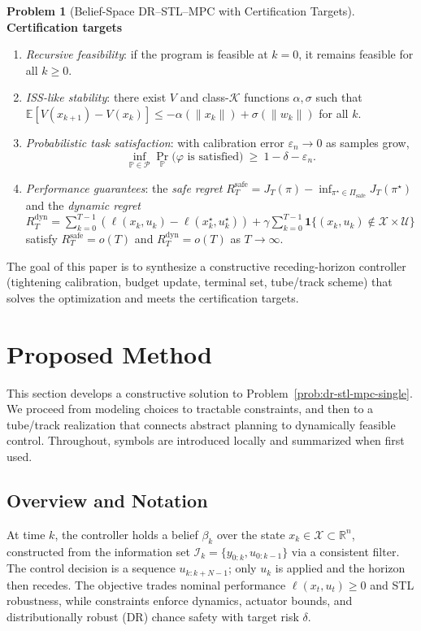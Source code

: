 \documentclass[journal]{IEEEtran}
\theoremstyle{definition}
\newtheorem{problem}{Problem}
\begin{document}
\begin{problem}[Belief-Space DR--STL--MPC with Certification Targets]
\textbf{Certification targets}
\begin{enumerate}
  \item \emph{Recursive feasibility}: if the program is feasible at $k{=}0$, it remains feasible for all $k\ge 0$.
  \item \emph{ISS-like stability}: there exist $V$ and class-$\mathcal{K}$ functions $\alpha,\sigma$ such that
        $\mathbb{E}[V(x_{k+1})-V(x_k)] \le -\alpha(\|x_k\|)+\sigma(\|w_k\|)$ for all $k$.
  \item \emph{Probabilistic task satisfaction}: with calibration error $\varepsilon_n\!\to\!0$ as samples grow,
        \[
        \inf_{\mathbb{P}\in\mathcal{P}}\Pr_{\mathbb{P}}\big(\text{$\varphi$ is satisfied}\big)\ \ge\ 1-\delta-\varepsilon_n.
        \]
  \item \emph{Performance guarantees}: the \emph{safe regret}
        $R_T^{\mathrm{safe}}
        =J_T(\pi)-\inf_{\pi^\star\in\Pi_{\mathrm{safe}}}J_T(\pi^\star)$
        and the \emph{dynamic regret}
        $R_T^{\mathrm{dyn}}
        =\sum_{k=0}^{T-1}(\ell(x_k,u_k)-\ell(x_k^\star,u_k^\star))
        +\gamma\sum_{k=0}^{T-1}\mathbf{1}\{(x_k,u_k)\notin\mathcal{X}\times\mathcal{U}\}$
        satisfy $R_T^{\mathrm{safe}}=o(T)$ and $R_T^{\mathrm{dyn}}=o(T)$ as $T\to\infty$.
\end{enumerate}

The goal of this paper is to synthesize a constructive receding-horizon controller (tightening calibration, budget update, terminal set, tube/track scheme)
that solves the optimization and meets the certification targets.
\end{problem}
 
\section{Proposed Method}
\label{sec:method}

This section develops a constructive solution to Problem~\ref{prob:dr-stl-mpc-single}.
We proceed from modeling choices to tractable constraints, and then to a tube/track realization
that connects abstract planning to dynamically feasible control. Throughout, symbols are introduced
locally and summarized when first used.

\subsection{Overview and Notation}
At time $k$, the controller holds a belief $\beta_k$ over the state $x_k\in\mathcal{X}\subset\mathbb{R}^n$,
constructed from the information set $\mathcal{I}_k=\{y_{0:k},u_{0:k-1}\}$ via a consistent filter.
The control decision is a sequence $u_{k:k+N-1}$; only $u_k$ is applied and the horizon then recedes.
The objective trades nominal performance $\ell(x_t,u_t)\ge 0$ and STL robustness, while constraints
enforce dynamics, actuator bounds, and distributionally robust (DR) chance safety with target risk $\delta$.
\end{document}

